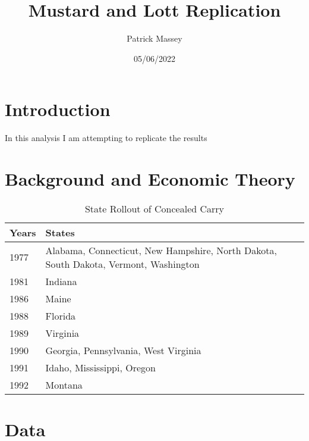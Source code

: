 \documentclass{article}
\author{Patrick Massey}
\title{Mustard and Lott Replication}
\date{05/06/2022}
\begin{document}
\maketitle

\section*{Introduction}
In this analysis I am attempting to replicate the results 
\section*{Background and Economic Theory}
\begin{table}[h]

\caption{\label{tab:rollout}State Rollout of Concealed Carry}
\centering
\begin{tabular}[t]{ll}
\toprule
Years & States\\
\midrule
1977 & Alabama, Connecticut, New Hampshire, North Dakota, South Dakota, Vermont, Washington\\
1981 & Indiana\\
1986 & Maine\\
1988 & Florida\\
1989 & Virginia\\
1990 & Georgia, Pennsylvania, West Virginia\\
1991 & Idaho, Mississippi, Oregon\\
1992 & Montana\\
\bottomrule
\end{tabular}
\end{table}
\section*{Data}
\end{document}
